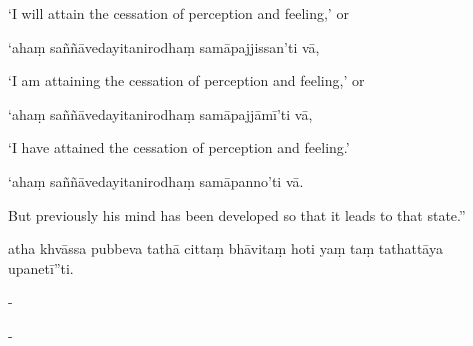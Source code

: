 \begin{samepage}
\begin{leftcolumn*}
‘I will attain the cessation of perception and feeling,’ or
\end{leftcolumn*}

\begin{rightcolumn}
‘ahaṃ saññāvedayitanirodhaṃ samāpajjissan’ti vā,
\end{rightcolumn}
\end{samepage}

\begin{samepage}
\begin{leftcolumn*}
‘I am attaining the cessation of perception and feeling,’ or
\end{leftcolumn*}

\begin{rightcolumn}
‘ahaṃ saññāvedayitanirodhaṃ samāpajjāmī’ti vā,
\end{rightcolumn}
\end{samepage}

\begin{samepage}
\begin{leftcolumn*}
‘I have attained the cessation of perception and feeling.’
\end{leftcolumn*}

\begin{rightcolumn}
‘ahaṃ saññāvedayitanirodhaṃ samāpanno’ti vā.
\end{rightcolumn}
\end{samepage}

\begin{samepage}
\begin{leftcolumn*}
But previously his mind has been developed so that it leads to that state.”
\end{leftcolumn*}

\begin{rightcolumn}
atha khvāssa pubbeva tathā cittaṃ bhāvitaṃ hoti yaṃ taṃ tathattāya upanetī”ti.
\end{rightcolumn}
\end{samepage}

\begin{samepage}
\begin{leftcolumn*}
-
\end{leftcolumn*}

\begin{rightcolumn}
-
\end{rightcolumn}
\end{samepage}

